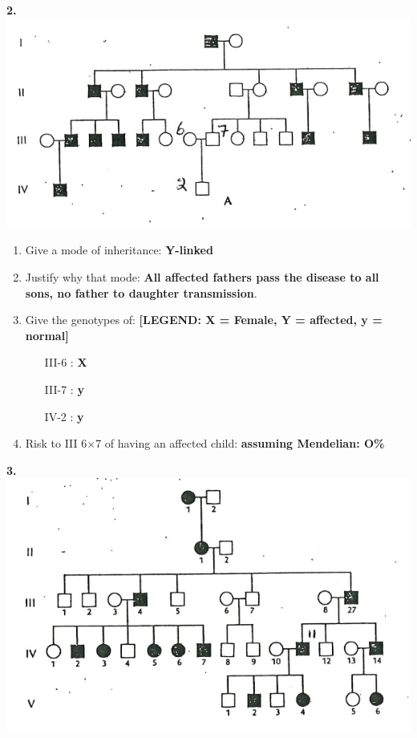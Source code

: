 \documentclass[plain,basic]{inVerba-notes}
\begin{document}
    \begin{center}
        \hspace{-25pt}\textbf{2.}\hspace{80pt}\includegraphics[scale=0.5,angle=-0.5,origin=c]{images/pedigree-2.png}
    \end{center}
    \begin{enumerate}[label=\alph*]
        \item Give a mode of inheritance: \textbf{Y-linked}
        \item Justify why that mode: \textbf{All affected fathers pass the disease to all sons, no father to daughter transmission}.
        \item Give the genotypes of: \textbf{[LEGEND: X = Female, Y = affected, y = normal]}
        \begin{multicols}{3}
            \begin{enumerate}
                \item[III-6]: \textbf{X}
                \item[III-7]: \textbf{y}
                \item[IV-2]: \textbf{y}
            \end{enumerate}
        \end{multicols}
        \item Risk to III 6×7 of having an affected child: \textbf{assuming Mendelian: O\%}
    \end{enumerate}
    \begin{center}
        \hspace{-20pt}\textbf{3.}\hspace{100pt}\includegraphics[scale=0.5,angle=-0.5,origin=c]{images/pedigree-3.png}
    \end{center}
\end{document}
